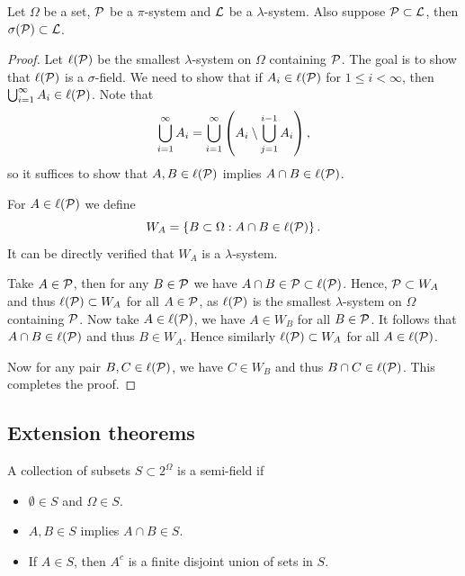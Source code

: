 \documentclass[a4paper]{article}
\begin{document}
\begin{thm}
  Let $\Omega$ be a set, $\P$ be a $\pi$-system and $\L$ be a $\lambda$-system.
  Also suppose $\P \subset \L$, then $\sigma (\P) \subset \L$.
\end{thm}

\begin{proof}
  Let $\ell (\P)$ be the smallest $\lambda$-system on $\Omega$ containing
  $\P$. The goal is to show that $\ell (\P)$ is a $\sigma$-field.
  We need to show that if $A_i \in \ell (\P)$ for $1 \leq i < \infty$,
  then $\cupinfi A_i \in \ell (\P)$. Note that
  \[
  \cupinfi A_i = \cupinfi \left( A_i \setminus \cupj^{i - 1} A_i \right),
  \]
  so it suffices to show that $A, B \in \ell (\P)$ implies $A \cap B \in
  \ell (\P)$.

  For $A \in \ell(\P)$ we define
  \[
  W_A = \left\{ B \subset \Omega : A \cap B \in \ell (\P) \right\}.
  \]
  It can be directly verified that $W_A$ is a $\lambda$-system.

  Take $A \in \P$, then for any $B \in \P$ we have $A \cap B \in \P
  \subset \ell (\P)$. Hence, $\P \subset W_A$ and thus $\ell (\P) \subset W_A$
  for all $A \in \P$, as $\ell (\P)$ is the smallest $\lambda$-system on
  $\Omega$ containing $\P$.
  Now take $A \in \ell (\P)$, we have $A \in W_B$
  for all $B \in \P$. It follows that $A \cap B \in \ell (\P)$ and thus
  $B \in W_A$. Hence similarly
  $\ell (\P) \subset W_A$ for all $A \in \ell (\P)$.

  Now for any pair $B, C \in \ell (\P)$, we have $C \in W_B$ and thus
  $B \cap C \in \ell (\P)$. This completes the proof.

\end{proof}

\subsection{Extension theorems}

\begin{defi}
  A collection of subsets $S \subset 2^{\Omega}$ is a semi-field if
  \begin{itemize}
    \item $\emptyset \in S$ and $\Omega \in S$.
    \item $A, B \in S$ implies $A \cap B \in S$.
    \item If $A \in S$, then $A^c$ is a finite disjoint union of sets in $S$.
  \end{itemize}
\end{defi}
\end{document}
